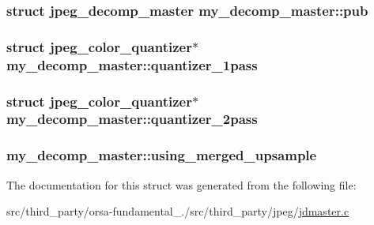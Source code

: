 \subsubsection[{pub}]{\setlength{\rightskip}{0pt plus 5cm}struct {\bf jpeg\+\_\+decomp\+\_\+master} my\+\_\+decomp\+\_\+master\+::pub}\label{structmy__decomp__master_ab9a692c30b5f1cc03d9074ad3c69af3f}
\hypertarget{structmy__decomp__master_af72048ba84933f931c09153470ff4f0b}{}
\subsubsection[{quantizer\+\_\+1pass}]{\setlength{\rightskip}{0pt plus 5cm}struct {\bf jpeg\+\_\+color\+\_\+quantizer}$\ast$ my\+\_\+decomp\+\_\+master\+::quantizer\+\_\+1pass}\label{structmy__decomp__master_af72048ba84933f931c09153470ff4f0b}
\hypertarget{structmy__decomp__master_a9a5f56ccbaec7d13e08e0cfb9d7a3974}{}
\subsubsection[{quantizer\+\_\+2pass}]{\setlength{\rightskip}{0pt plus 5cm}struct {\bf jpeg\+\_\+color\+\_\+quantizer}$\ast$ my\+\_\+decomp\+\_\+master\+::quantizer\+\_\+2pass}\label{structmy__decomp__master_a9a5f56ccbaec7d13e08e0cfb9d7a3974}
\hypertarget{structmy__decomp__master_af7ab207dfbf091b4de60e6fe3938f4a4}{}
\subsubsection[{using\+\_\+merged\+\_\+upsample}]{ my\+\_\+decomp\+\_\+master\+::using\+\_\+merged\+\_\+upsample}\label{structmy__decomp__master_af7ab207dfbf091b4de60e6fe3938f4a4}


The documentation for this struct was generated from the following file\+:\begin{DoxyCompactItemize}
\item 
src/third\+\_\+party/orsa-\/fundamental\+\_./src/third\+\_\+party/jpeg/\hyperlink{jdmaster_8c}{jdmaster.\+c}\end{DoxyCompactItemize}

